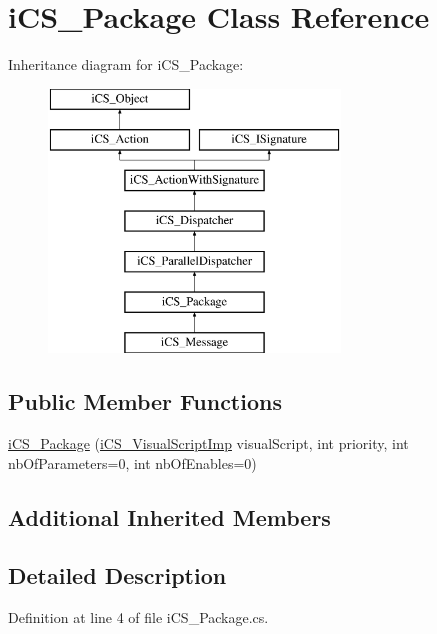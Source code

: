 \hypertarget{classi_c_s___package}{\section{i\+C\+S\+\_\+\+Package Class Reference}
\label{classi_c_s___package}
}
Inheritance diagram for i\+C\+S\+\_\+\+Package\+:\begin{figure}[H]
\begin{center}
\leavevmode
\includegraphics[height=7.000000cm]{classi_c_s___package}
\end{center}
\end{figure}
\subsection*{Public Member Functions}
\begin{DoxyCompactItemize}
\item 
\hyperlink{classi_c_s___package_a996c257ed3aa43f152f36eb009d33e61}{i\+C\+S\+\_\+\+Package} (\hyperlink{classi_c_s___visual_script_imp}{i\+C\+S\+\_\+\+Visual\+Script\+Imp} visual\+Script, int priority, int nb\+Of\+Parameters=0, int nb\+Of\+Enables=0)
\end{DoxyCompactItemize}
\subsection*{Additional Inherited Members}


\subsection{Detailed Description}


Definition at line 4 of file i\+C\+S\+\_\+\+Package.\+cs.



